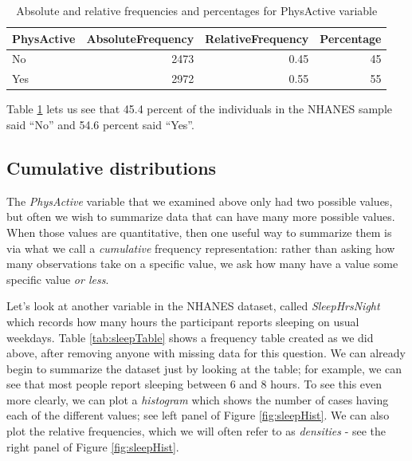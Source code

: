 \documentclass[
  12pt,
]{book}
\begin{document}
\begin{table}

\caption{\label{tab:PhysActiveTableFiltered}Absolute and relative frequencies and percentages for PhysActive variable}
\centering
\begin{tabular}[t]{l|r|r|r}
\hline
PhysActive & AbsoluteFrequency & RelativeFrequency & Percentage\\
\hline
No & 2473 & 0.45 & 45\\
\hline
Yes & 2972 & 0.55 & 55\\
\hline
\end{tabular}
\end{table}

Table \ref{tab:PhysActiveTableFiltered} lets us see that 45.4 percent of the individuals in the NHANES sample said ``No'' and 54.6 percent said ``Yes''.

\hypertarget{cumulative-distributions}{%
\subsection{Cumulative distributions}\label{cumulative-distributions}}

The \emph{PhysActive} variable that we examined above only had two possible values, but often we wish to summarize data that can have many more possible values. When those values are quantitative, then one useful way to summarize them is via what we call a \emph{cumulative} frequency representation: rather than asking how many observations take on a specific value, we ask how many have a value some specific value \emph{or less}.

Let's look at another variable in the NHANES dataset, called \emph{SleepHrsNight} which records how many hours the participant reports sleeping on usual weekdays. Table \ref{tab:sleepTable} shows a frequency table created as we did above, after removing anyone with missing data for this question. We can already begin to summarize the dataset just by looking at the table; for example, we can see that most people report sleeping between 6 and 8 hours. To see this even more clearly, we can plot a \emph{histogram} which shows the number of cases having each of the different values; see left panel of Figure \ref{fig:sleepHist}. We can also plot the relative frequencies, which we will often refer to as \emph{densities} - see the right panel of Figure \ref{fig:sleepHist}.
\end{document}

